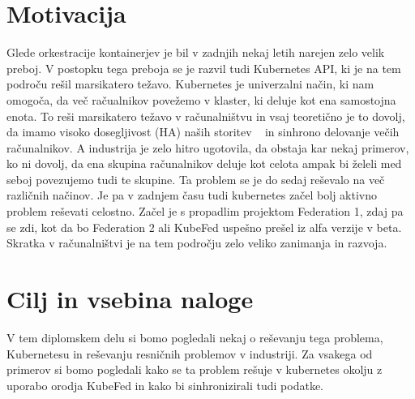 \documentclass[a4paper, 12pt]{book}
\begin{document}
\section{Motivacija}
Glede orkestracije kontainerjev je bil v zadnjih nekaj letih narejen zelo velik preboj. 
V postopku tega preboja se je razvil tudi Kubernetes API, ki je na tem področu rešil marsikatero težavo.
Kubernetes  je univerzalni način, ki nam omogoča, da več račualnikov povežemo v klaster, ki deluje kot ena samostojna enota. 
To reši marsikatero težavo v računalništvu in vsaj teoretično je to dovolj, da imamo visoko dosegljivost (HA) naših storitev ~\cite{mastering-kubernetes} in sinhrono delovanje večih računalnikov.
A industrija je zelo hitro ugotovila, da obstaja kar nekaj primerov, ko ni dovolj, da ena skupina računalnikov deluje kot celota ampak bi želeli med seboj povezujemo tudi te skupine.
Ta problem se je do sedaj reševalo na več različnih načinov.
Je pa v zadnjem času tudi kubernetes začel bolj aktivno problem reševati celostno.
Začel je s propadlim projektom Federation 1, zdaj pa se zdi, kot da bo Federation 2 ali KubeFed uspešno prešel iz alfa verzije v beta.
Skratka v računalništvi je na tem področju zelo veliko zanimanja in razvoja.
\section{Cilj in vsebina naloge}
V tem diplomskem delu si bomo pogledali nekaj o reševanju tega problema, Kubernetesu in reševanju resničnih problemov v industriji. 
Za vsakega od primerov si bomo pogledali kako se ta problem rešuje v kubernetes okolju z uporabo orodja KubeFed in kako bi sinhronizirali tudi podatke.
\end{document}
